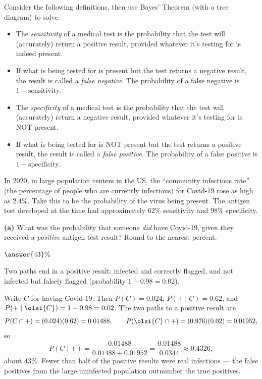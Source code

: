 \documentclass[12pt]{ximera}
\begin{document}
\begin{problem}
Consider the following definitions, then use Bayes' Theorem (with a tree diagram) to
solve.
\begin{itemize}
\item The \emph{sensitivity} of a medical test is the probability that the test will
      (accurately) return a positive result, provided whatever it's testing for is
      indeed present.
\item If what is being tested for is present but the test returns a negative result,
      the result is called a \emph{false negative}. The probability of a false negative
      is $1-\text{sensitivity}$.
\item The \emph{specificity} of a medical test is the probability that the test will
      (accurately) return a negative result, provided whatever it's testing for is NOT
      present.
\item If what is being tested for is NOT present but the test returns a positive result,
      the result is called a \emph{false positive}. The probability of a false positive
      is $1-\text{specificity}$.
\end{itemize}

In 2020, in large population centers in the US, the ``community infectious rate'' (the
percentage of people who are currently infectious) for Covid-19 rose as high as $2.4\%$.
Take this to be the probability of the virus being present. The antigen test developed
at the time had approximately $62\%$ sensitivity and $98\%$ specificity.

\begin{prompt}
\textbf{(a)} What was the probability that someone \emph{did} have Covid-19, given
they received a \emph{positive} antigen test result? Round to the nearest percent.

$\answer{43}\%$

\begin{hint}
Two paths end in a positive result: infected and correctly flagged, and not infected
but falsely flagged (probability $1-0.98=0.02$).
\end{hint}

\begin{feedback}
Write $C$ for having Covid-19. Then $P(C)=0.024$, $P(+\mid C)=0.62$, and
$P\!\left(+\mid\olsi{C}\right)=1-0.98=0.02$. The two paths to a positive result are
\[
P(C\cap +)=(0.024)(0.62)=0.01488, \qquad P\!\left(\olsi{C}\cap +\right)=(0.976)(0.02)=0.01952,
\]
so
\[
P(C\mid +)=\frac{0.01488}{0.01488+0.01952}=\frac{0.01488}{0.0344}\approx 0.4326,
\]
about $43\%$. Fewer than half of the positive results were real infections --- the
false positives from the large uninfected population outnumber the true positives.
\end{feedback}
\end{prompt}


\end{problem}
\end{document}
